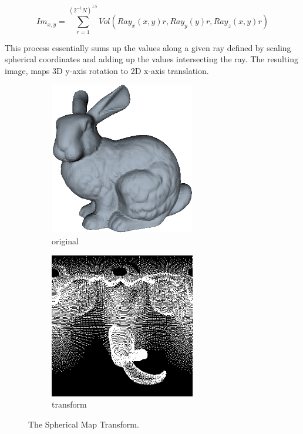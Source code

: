 \begin{equation} \label{eqn:smtUpdate}
Im_{x,y} = \sum_{r=1}^{(2^{-1}N)^{1.5}}{Vol(Ray_x(x,y)r, Ray_y(y)r, Ray_z(x,y)r)} 
\end{equation}

This process essentially sums up the values along a given ray defined by scaling spherical coordinates and adding up the values intersecting the ray. The resulting image, maps 3D y-axis rotation to 2D x-axis translation.  \\

\begin{figure}[!htb] 
        \centering
        \begin{subfigure}[b]{2.5in}
                \includegraphics[width=2.5in]{images/ch2/bunny}
                \caption{original}
                \label{fig:bunnyOrig}
        \end{subfigure}
        \begin{subfigure}[b]{2.5in}
                \includegraphics[width=2.5in]{images/ch2/spherical2DMap}
                \caption{transform}
                \label{fig:bunnySPTed}
        \end{subfigure}%
        \caption{The Spherical Map Transform.}
       \label{fig:smtExample}
\end{figure}


